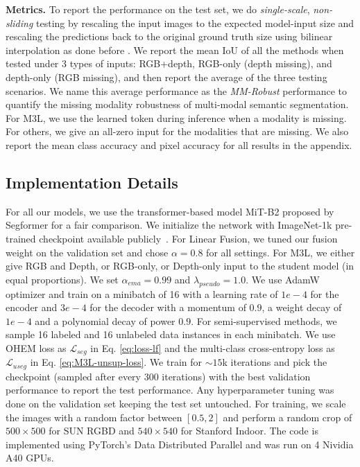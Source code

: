 \documentclass[10pt,twocolumn,letterpaper]{article}
\begin{document}
\noindent\textbf{Metrics.} To report the performance on the test set, we do \emph{single-scale}, \emph{non-sliding} testing by rescaling the input images to the expected model-input size and rescaling the predictions back to the original ground truth size using bilinear interpolation as done before \cite{chen2021-CPS, u2pl}. 
We report the mean IoU of all the methods when tested under 3 types of inputs: RGB+depth, RGB-only (depth missing), and depth-only (RGB missing), and then report the average of the three testing scenarios. We name this average performance as the \textit{MM-Robust} performance to quantify the missing modality robustness of multi-modal semantic segmentation. For M3L, we use the learned token during inference when a modality is missing.  For others, we give an all-zero input for the modalities that are missing. We also report the mean class accuracy and pixel accuracy for all results in the appendix.

\subsection{Implementation Details}
For all our models, we use the transformer-based model MiT-B2 proposed by Segformer \cite{segformer} for a fair comparison. We initialize the network with ImageNet-1k pre-trained checkpoint available publicly~\cite{segformer}.
For Linear Fusion, we tuned our fusion weight on the validation set and chose $\alpha = 0.8$ for all settings. 
For M3L, we either give RGB and Depth, or RGB-only, or Depth-only input to the student model (in equal proportions). We set $\alpha_{ema} = 0.99$ and $\lambda_{pseudo} = 1.0$. 
We use AdamW optimizer \cite{adamw} and train on a minibatch of 16 with a learning rate of $1e-4$ for the encoder and $3e-4$ for the decoder with a momentum of $0.9$, a weight decay of $1e-4$ and a polynomial decay of power $0.9$. 
For semi-supervised methods, we sample 16 labeled and 16 unlabeled data instances in each minibatch.
We use OHEM loss \cite{ohem} as $\mathcal{L}_{seg}$ in Eq. \ref{eq:loss-lf} and the multi-class cross-entropy loss as $\mathcal{L}_{useg}$ in Eq. \ref{eq:M3L-unsup-loss}. We train for $\sim15$k
iterations and pick the checkpoint (sampled after every $300$ iterations) with the best validation performance to report the test performance. Any hyperparameter tuning was done on the validation set keeping the test set untouched.
For training, we scale the images with a random factor between $[0.5, 2]$ and perform a random crop of $500\times500$ for SUN RGBD and $540\times540$ for Stanford Indoor. 
The code is implemented using PyTorch's Data Distributed Parallel and was run on 4 Nividia A40 GPUs. 
\end{document}
